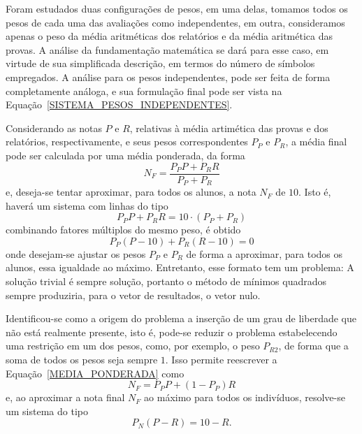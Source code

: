 \documentclass[11pt]{article}
\begin{document}
		Foram estudados duas configurações de pesos, em
		uma delas, tomamos todos os pesos de cada uma
		das avaliações como independentes, em outra,
		consideramos apenas o peso da média
		aritméticas dos relatórios e da
                média aritmética das provas. A análise
                da fundamentação matemática se dará para esse
                caso, em virtude de sua simplificada
                descrição, em termos do número de
                símbolos empregados. A análise para os pesos
                independentes, pode ser feita de forma
                completamente análoga, e sua formulação final
                pode ser vista na
                Equação~\ref{SISTEMA_PESOS_INDEPENDENTES}.

		Considerando as notas $P$ e $R$, relativas
                à média artimética das provas e dos relatórios,
                respectivamente, e seus pesos correspondentes
                $P_P$ e $P_R$, a média final pode ser calculada
                por uma média ponderada, da forma
                \begin{equation}
                        N_F =
			\frac{P_{P}P + P_{R}R}
			     {P_{P} + P_{R}}
                        \label{MEDIA_PONDERADA}
                \end{equation}
		e, deseja-se tentar aproximar, para todos os
		alunos, a nota $N_F$ de $10$. Isto é, haverá
		um sistema com linhas do tipo
                \begin{equation*}
			P_{P}P + P_{R}R =
			10\cdot
			  \left(
			  P_{P} + P_{R}
			  \right)
                \end{equation*}
		combinando fatores múltiplos do mesmo peso,
		é obtido
                \begin{equation*}
                        P_{P}(P - 10) + P_{R}(R - 10) = 0
                \end{equation*}
                onde desejam-se ajustar os pesos $P_{P}$ e
                $P_{R}$ de forma a aproximar, para todos os
                alunos, essa igualdade ao máximo.
		Entretanto, esse formato tem um problema: A
		solução trivial é sempre solução, portanto o
		método de mínimos quadrados sempre produziria,
		para o vetor de resultados, o vetor nulo.

		Identificou-se como a origem do problema a
		inserção de um grau de liberdade que não está
		realmente presente, isto é, pode-se reduzir o
		problema estabelecendo uma restrição em um dos
		pesos, como, por exemplo, o peso $P_{R2}$, de
		forma que a soma de todos os pesos seja sempre
		$1$. Isso permite reescrever a
                Equação~\ref{MEDIA_PONDERADA} como
                \begin{equation*}
                        N_F = P_{P}P + (1 - P_{P})R
                        \label{MEDIA_PONDERADA}
                \end{equation*}
                e, ao aproximar a nota final $N_F$ ao máximo
                para todos os indivíduos, resolve-se um
                sistema do tipo
		\begin{equation}
			P_{N}(P - R) =  10 - R.
			\label{SISTEMA_PESOS_SIMPLES}
		\end{equation}
\end{document}
